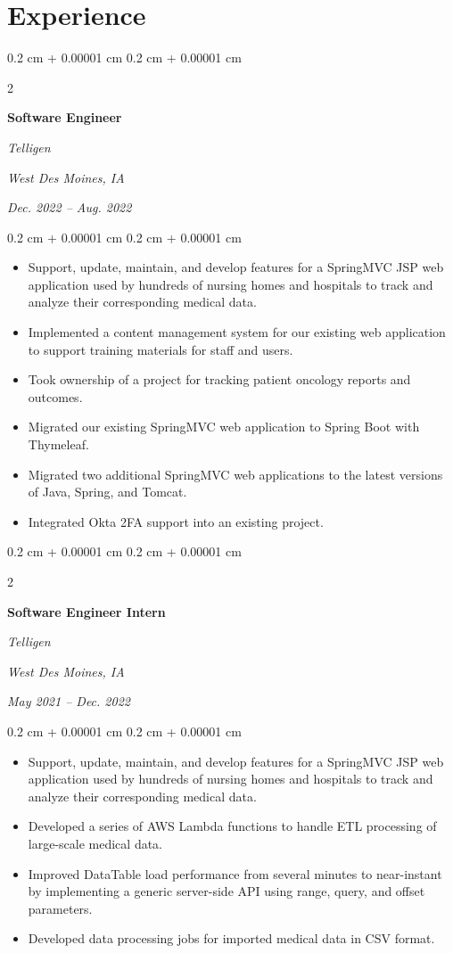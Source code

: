 \documentclass[10pt, letterpaper]{article}
\newenvironment{highlights}{
    \begin{itemize}[
        topsep=0.10 cm,
        parsep=0.10 cm,
        partopsep=0pt,
        itemsep=0pt,
        leftmargin=0.4 cm + 10pt
    ]
}{
    \end{itemize}
} %
\newenvironment{onecolentry}{
    \begin{adjustwidth}{
        0.2 cm + 0.00001 cm
    }{
        0.2 cm + 0.00001 cm
    }
}{
    \end{adjustwidth}
} %
\newenvironment{twocolentry}[2][]{
    \onecolentry
    \def\secondColumn{#2}
    \setcolumnwidth{\fill, 4.5 cm}
    \begin{paracol}{2}
}{
    \switchcolumn \raggedleft \secondColumn
    \end{paracol}
    \endonecolentry
} %
\begin{document}
\section{Experience}

\begin{twocolentry}{
		\textit{West Des Moines, IA}    
		            
		\textit{Dec. 2022 – Aug. 2022}}
	\textbf{Software Engineer}
	            
	\textit{Telligen}
\end{twocolentry}

\vspace{0.10 cm}
\begin{onecolentry}
	\begin{highlights}
		\item Support, update, maintain, and develop features for a SpringMVC JSP web application used by hundreds of nursing homes and hospitals to track and analyze their corresponding medical data.
		\item Implemented a content management system for our existing web application to support training materials for staff and users.
		\item Took ownership of a project for tracking patient oncology reports and outcomes.
		\item Migrated our existing SpringMVC web application to Spring Boot with Thymeleaf.
		\item Migrated two additional SpringMVC web applications to the latest versions of Java, Spring, and Tomcat.
		\item Integrated Okta 2FA support into an existing project.
	\end{highlights}
\end{onecolentry}

\vspace{0.2 cm}

\begin{twocolentry}{
		\textit{West Des Moines, IA}    
		            
		\textit{May 2021 – Dec. 2022}}
	\textbf{Software Engineer Intern}
	            
	\textit{Telligen}
\end{twocolentry}

\vspace{0.10 cm}
\begin{onecolentry}
	\begin{highlights}
		\item Support, update, maintain, and develop features for a SpringMVC JSP web application used by hundreds of nursing homes and hospitals to track and analyze their corresponding medical data.
		\item Developed a series of AWS Lambda functions to handle ETL processing of large-scale medical data.
		\item Improved DataTable load performance from several minutes to near-instant by implementing a generic server-side API using range, query, and offset parameters.
		\item Developed data processing jobs for imported medical data in CSV format.
	\end{highlights}
\end{onecolentry}
\end{document}
